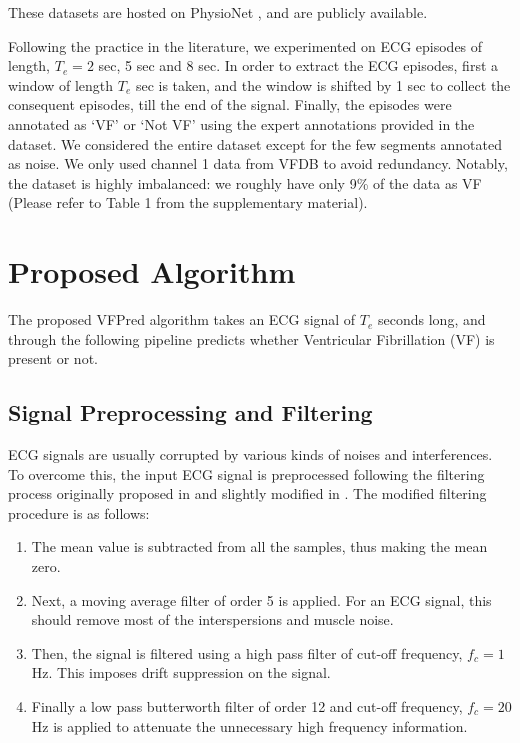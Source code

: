 \documentclass[12pt,a4paper]{article}
\begin{document}
These datasets are hosted on PhysioNet \cite{goldberger2000physiobank}, and are publicly available.

Following the practice in the literature, we experimented on ECG episodes of length, $T_e = 2$ sec, 5 sec and 8 sec. In order to extract the ECG episodes, first a window of length $T_e$ sec is taken, and the window is shifted by 1 sec to collect the consequent episodes, till the end of the signal. Finally, the episodes were annotated as `VF' or `Not VF' using the expert annotations provided in the dataset. We considered the entire dataset except for the few segments annotated as noise. We only used channel 1 data from VFDB to avoid redundancy. Notably, the dataset is highly imbalanced: we roughly have only 9\% of the data as VF (Please refer to Table 1 from the supplementary material).

\section{Proposed Algorithm}
\label{Methods}
The proposed VFPred algorithm takes an ECG signal of $T_e$ seconds long, and through the following pipeline predicts whether Ventricular Fibrillation (VF) is present or not.

\subsection{Signal Preprocessing and Filtering}

ECG signals are usually corrupted by various kinds of noises and interferences.  To overcome this, the input ECG signal is preprocessed following the filtering process originally proposed in \cite{amann2005reliability} and slightly modified in \cite{anas2011exploiting}. The modified filtering procedure is as follows:

\begin{enumerate}
    \item The mean value is subtracted from all the samples, thus making the mean zero.
    \item Next, a moving average filter of order 5 is applied. For an ECG signal, this should remove most of the interspersions and muscle noise.
    \item Then, the signal is filtered using a high pass filter of cut-off frequency, $f_c = 1$ Hz. This imposes drift suppression on the signal.
    \item Finally a low pass butterworth filter of order 12  and cut-off frequency, $f_c = 20$ Hz is applied to attenuate the unnecessary high frequency information.
\end{enumerate}
\end{document}
